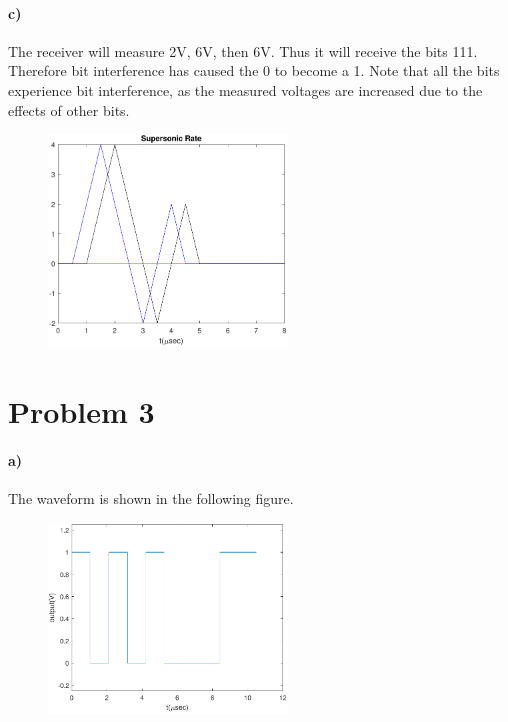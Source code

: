 \documentclass[12pt]{article}
\begin{document}
\paragraph{c)}

The receiver will measure 2V, 6V, then 6V. Thus it will receive the bits 111. Therefore bit interference has caused the 0 to become a 1. Note that all the bits experience
bit interference, as the measured voltages are increased due to the effects of other bits.

\begin{figure}[H]
    \begin{center}
        \includegraphics[width=2.5in]{problem2c.pdf}
    \end{center}
\end{figure}

\section*{Problem 3}

\paragraph{a)}

The waveform is shown in the following figure.
\begin{figure}[H]
    \begin{center}
        \includegraphics[width=2.5in]{problem3a.pdf}
    \end{center}
\end{figure}
\end{document}
